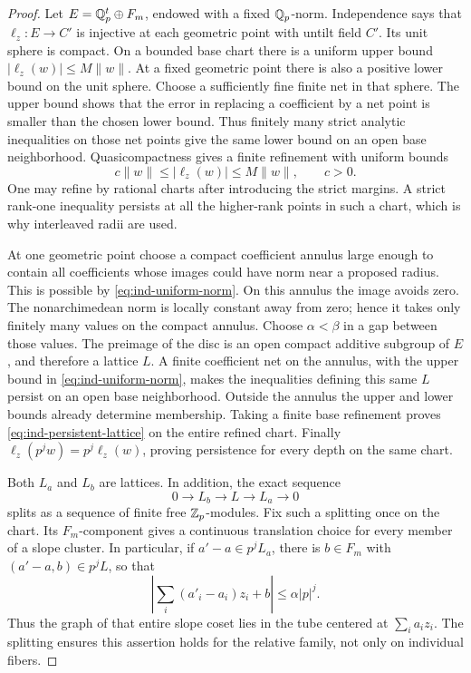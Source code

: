 \begin{proof}
Let $E=\mathbb Q_p^t\oplus F_m$, endowed with a fixed $\mathbb Q_p$-norm.
Independence says that $\ell_z:E\to C'$ is injective at each
geometric point with untilt field $C'$.  Its unit sphere is compact.
On a bounded base chart there is a uniform upper bound
$|\ell_z(w)|\leq M\|w\|$.  At a fixed geometric point there is also
a positive lower bound on the unit sphere.  Choose a sufficiently
fine finite net in that sphere.  The upper bound shows that the
error in replacing a coefficient by a net point is smaller than the
chosen lower bound.  Thus finitely many strict analytic inequalities
on those net points give the same lower bound on an open base
neighborhood.  Quasicompactness gives a finite refinement with
uniform bounds
\begin{equation}
 \label{eq:ind-uniform-norm}
  c\|w\|\leq |\ell_z(w)|\leq M\|w\|,
       \qquad c>0.
\end{equation}
One may refine by rational charts after introducing the strict
margins.  A strict rank-one inequality persists at all the
higher-rank points in such a chart, which is why interleaved radii
are used.

At one geometric point choose a compact coefficient annulus large
enough to contain all coefficients whose images could have norm
near a proposed radius.  This is possible by
\cref{eq:ind-uniform-norm}.  On this annulus the image avoids zero.
The nonarchimedean norm is locally constant away from zero; hence
it takes only finitely many values on the compact annulus.  Choose
$\alpha<\beta$ in a gap between those values.  The preimage of the
disc is an open compact additive subgroup of $E$, and therefore a
lattice $L$.  A finite coefficient net on the annulus, with the
upper bound in \cref{eq:ind-uniform-norm}, makes the inequalities
defining this same $L$ persist on an open base neighborhood.
Outside the annulus the upper and lower bounds already determine
membership.  Taking a finite base refinement proves
\cref{eq:ind-persistent-lattice} on the entire refined chart.
Finally
$\ell_z(p^jw)=p^j\ell_z(w)$, proving persistence for every depth on
the same chart.

Both $L_a$ and $L_b$ are lattices.  In addition, the exact sequence
\[
 0\longrightarrow L_b\longrightarrow L
     \longrightarrow L_a\longrightarrow0
\]
splits as a sequence of finite free $\mathbb Z_p$-modules.  Fix such a
splitting once on the chart.  Its $F_m$-component gives a continuous
translation choice for every member of a slope cluster.  In
particular, if $a'-a\in p^jL_a$, there is $b\in F_m$ with
$(a'-a,b)\in p^jL$, so that
\[
 \left|\sum_i(a'_i-a_i)z_i+b\right|
       \leq\alpha|p|^j.
\]
Thus the graph of that entire slope coset lies in the tube centered
at $\sum_i a_i z_i$.  The splitting ensures this assertion holds
for the relative family, not only on individual fibers.


\end{proof}
